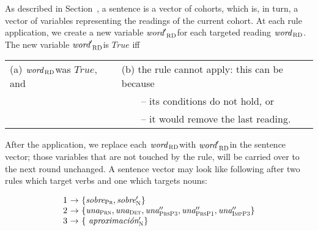 \def\newVar{$\text{\em word}'_\textsc{ RD}$}
\def\oldVar{$\text{\em word}_\textsc{\,RD}$}

\noindent 
As described in Section~, a sentence is a vector of cohorts, which is, in turn, a vector of variables representing the readings of the current cohort.
At each rule application, we create a new variable \newVar for each targeted reading \oldVar.
The new variable \newVar is $True$ iff 

\begin{tabular}{l l}
(a) \oldVar was $True$, and 
                             & (b) the rule cannot apply: this can be because \\
                                     & ~~~~-- its conditions do not hold, or \\
                                     & ~~~~-- it would remove the last reading.
\end{tabular}


 After the application, we replace each \oldVar with \newVar in the sentence vector; those variables that are not touched by the rule, will be carried over to the next round unchanged. A sentence vector may look like following after two rules which target verbs and one which targets nouns:

\begin{equation}
\begin{array}{l @{~\rightarrow~} l}
1 & \{\sobrePr, \sobre{}'_\n \} \\
2 & \{\unaPrn, \unaDet, \una{}''_\vPrsPThree, \una{}''_\vPrsPOne, \una{}''_\vImpPThree \} \\
3 & \{ \aproximacion{}'_\n \} \\
\end{array}
\label{eq:after3Rules}
\end{equation}


